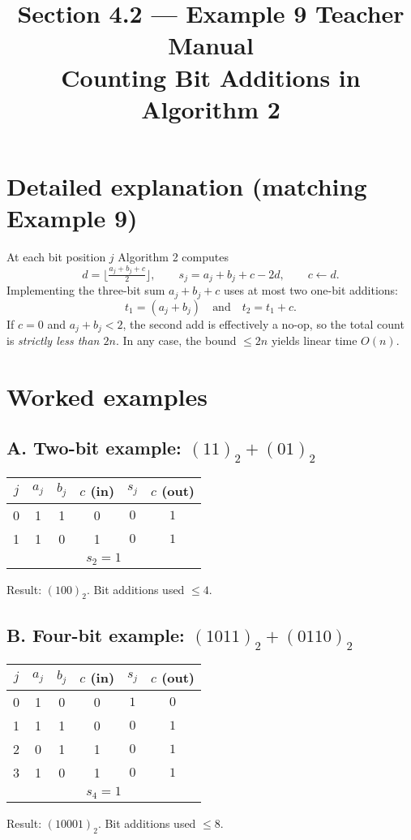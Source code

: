 \documentclass[12pt]{article}
\title{Section 4.2 — Example 9 Teacher Manual\\
Counting Bit Additions in Algorithm 2}
\author{}
\date{}
\begin{document}
\maketitle

\section*{Detailed explanation (matching Example 9)}
At each bit position $j$ Algorithm 2 computes
\[
d=\big\lfloor \tfrac{a_j+b_j+c}{2}\big\rfloor,\qquad s_j=a_j+b_j+c-2d,\qquad c\leftarrow d.
\]
Implementing the three-bit sum $a_j+b_j+c$ uses at most two one-bit additions:
\[
t_1=(a_j+b_j)\quad\text{and}\quad t_2=t_1+c.
\]
If $c=0$ and $a_j+b_j<2$, the second add is effectively a no-op, so the total count is \emph{strictly less than $2n$}. In any case, the bound $\le 2n$ yields linear time $O(n)$.

\section*{Worked examples}

\subsection*{A. Two-bit example: $(11)_2 + (01)_2$}
\begin{center}
\begin{tabular}{c|c c c|c c}
$j$ & $a_j$ & $b_j$ & $c$ (in) & $s_j$ & $c$ (out)\\\hline
0 & 1 & 1 & 0 & $0$ & $1$\\
1 & 1 & 0 & 1 & $0$ & $1$\\\hline
\multicolumn{6}{c}{$s_2=1$}
\end{tabular}
\end{center}
Result: $(100)_2$. Bit additions used $\le 4$.

\subsection*{B. Four-bit example: $(1011)_2 + (0110)_2$}
\begin{center}
\begin{tabular}{c|c c c|c c}
$j$ & $a_j$ & $b_j$ & $c$ (in) & $s_j$ & $c$ (out)\\\hline
0 & 1 & 0 & 0 & $1$ & $0$\\
1 & 1 & 1 & 0 & $0$ & $1$\\
2 & 0 & 1 & 1 & $0$ & $1$\\
3 & 1 & 0 & 1 & $0$ & $1$\\\hline
\multicolumn{6}{c}{$s_4=1$}
\end{tabular}
\end{center}
Result: $(10001)_2$. Bit additions used $\le 8$.
\end{document}
